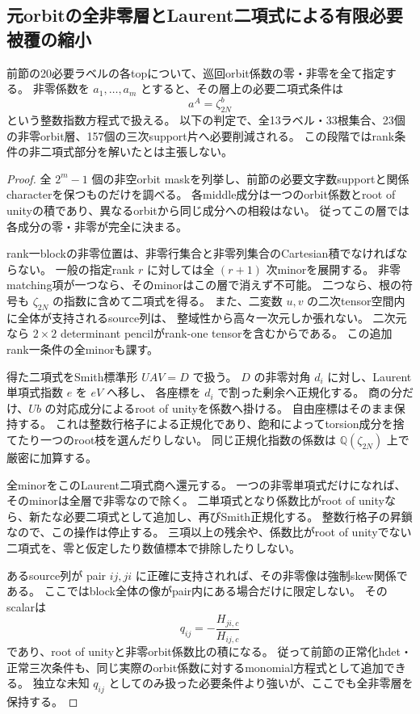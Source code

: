 \subsection{元orbitの全非零層とLaurent二項式による有限必要被覆の縮小}
\label{subsec:cubic-four-simple-orbit-torus}
\begin{proposition}[全非零orbit層の厳密な必要判定]
\label{prop:cubic-orbit-torus-sieve}
前節の20必要ラベルの各topについて、巡回orbit係数の零・非零を全て指定する。
非零係数を $a_1,\ldots,a_m$ とすると、その層上の必要二項式条件は
\[
 a^A=\zeta_{2N}^{b}
\]
という整数指数方程式で扱える。
以下の判定で、全13ラベル・33根集合、23個の非零orbit層、157個の三次support片へ必要削減される。
この段階ではrank条件の非二項式部分を解いたとは主張しない。
\end{proposition}
\begin{proof}
全 $2^m-1$ 個の非空orbit maskを列挙し、前節の必要文字数supportと関係characterを保つものだけを調べる。
各middle成分は一つのorbit係数とroot of unityの積であり、異なるorbitから同じ成分への相殺はない。
従ってこの層では各成分の零・非零が完全に決まる。

rank一blockの非零位置は、非零行集合と非零列集合のCartesian積でなければならない。
一般の指定rank $r$ に対しては全 $(r+1)$ 次minorを展開する。
非零matching項が一つなら、そのminorはこの層で消えず不可能。
二つなら、根の符号も $\zeta_{2N}$ の指数に含めて二項式を得る。
また、二変数 $u,v$ の二次tensor空間内に全体が支持されるsource列は、
整域性から高々一次元しか張れない。
二次元なら $2\times2$ determinant pencilがrank-one tensorを含むからである。
この追加rank一条件の全minorも課す。

得た二項式をSmith標準形 $UAV=D$ で扱う。
$D$ の非零対角 $d_i$ に対し、Laurent単項式指数 $e$ を $eV$ へ移し、
各座標を $d_i$ で割った剰余へ正規化する。
商の分だけ、$Ub$ の対応成分によるroot of unityを係数へ掛ける。
自由座標はそのまま保持する。
これは整数行格子による正規化であり、飽和によってtorsion成分を捨てたり一つのroot枝を選んだりしない。
同じ正規化指数の係数は $\mathbb Q(\zeta_{2N})$ 上で厳密に加算する。

全minorをこのLaurent二項式商へ還元する。
一つの非零単項式だけになれば、そのminorは全層で非零なので除く。
二単項式となり係数比がroot of unityなら、新たな必要二項式として追加し、再びSmith正規化する。
整数行格子の昇鎖なので、この操作は停止する。
三項以上の残余や、係数比がroot of unityでない二項式を、零と仮定したり数値標本で排除したりしない。

あるsource列が pair $ij,ji$ に正確に支持されれば、その非零像は強制skew関係である。
ここではblock全体の像がpair内にある場合だけに限定しない。
そのscalarは
\[
 q_{ij}=-\frac{H_{ji,c}}{H_{ij,c}}
\]
であり、root of unityと非零orbit係数比の積になる。
従って前節の正常化hdet・正常三次条件も、同じ実際のorbit係数に対するmonomial方程式として追加できる。
独立な未知 $q_{ij}$ としてのみ扱った必要条件より強いが、ここでも全非零層を保持する。


\end{proof}

